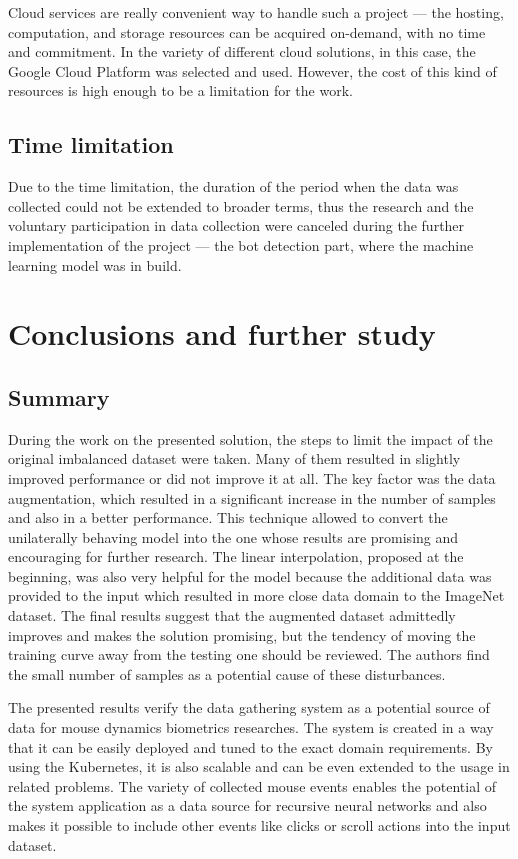 Cloud services are really convenient way to handle such a project --- the hosting, computation, and storage resources can be acquired on-demand, with no time and commitment.
In the variety of different cloud solutions, in this case, the Google Cloud Platform was selected and used.
However, the cost of this kind of resources is high enough to be a limitation for the work.

\subsection{Time limitation}\label{subsec:time-limitation}
Due to the time limitation, the duration of the period when the data was collected could not be extended to broader terms, thus the research and the voluntary participation in data collection were canceled during the further implementation of the project --- the bot detection part, where the machine learning model was in build.

\section{Conclusions and further study}\label{sec:conclusions-and-further-study}

\subsection{Summary}\label{subsec:summary}
During the work on the presented solution, the steps to limit the impact of the original imbalanced dataset were taken.
Many of them resulted in slightly improved performance or did not improve it at all.
The key factor was the data augmentation, which resulted in a significant increase in the number of samples and also in a better performance.
This technique allowed to convert the unilaterally behaving model into the one whose results are promising and encouraging for further research.
The linear interpolation, proposed at the beginning, was also very helpful for the model because the additional data was provided to the input which resulted in more close data domain to the ImageNet dataset.
The final results suggest that the augmented dataset admittedly improves and makes the solution promising, but the tendency of moving the training curve away from the testing one should be reviewed.
The authors find the small number of samples as a potential cause of these disturbances.

The presented results verify the data gathering system as a potential source of data for mouse dynamics biometrics researches.
The system is created in a way that it can be easily deployed and tuned to the exact domain requirements.
By using the Kubernetes, it is also scalable and can be even extended to the usage in related problems.
The variety of collected mouse events enables the potential of the system application as a data source for recursive neural networks and also makes it possible to include other events like clicks or scroll actions into the input dataset.

